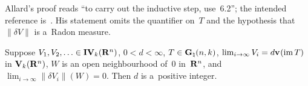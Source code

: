 \begin{remark}
    \label{rem:6.2}
    Allard's proof reads ``to carry out the inductive step, use~6.2''; the intended reference
    is~\cite[6.1]{Allard1972}. His statement omits the quantifier on~$T$ and the hypothesis that
    $\|\delta V\|$ is a~Radon measure.
\end{remark}

\begin{lemma}
    \label{al:6.3}
    Suppose $V_1, V_2, \ldots \in \mathbf{IV}_{k}(\mathbf{R}^{n})$, $0 < d < \infty$, $T \in
    \mathbf{G}_{\natural}(n,k)$, $\lim_{i \to \infty} V_i = d \mathbf{v}_{}(\operatorname{im} T)$ in
    $\mathbf{V}_{k}(\mathbf{R}^{n})$, $W$ is an open neighbourhood of~$0$ in~$\mathbf{R}^{n}$, and $\lim_{i
    \to \infty} \|\delta V_i\|(W) = 0$. Then $d$ is a~positive integer.
\end{lemma}

